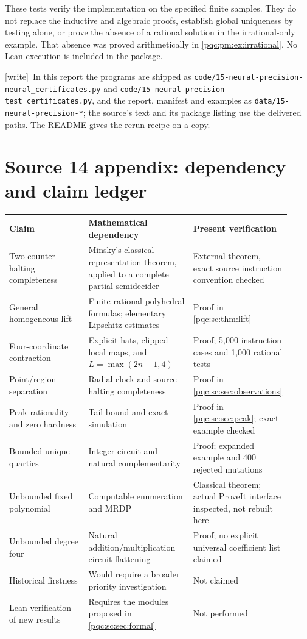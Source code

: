 \documentclass[11pt,letterpaper]{article}
\numberwithin{equation}{section}
\theoremstyle{definition}
\theoremstyle{remark}
\newcommand{\code}[1]{\nolinkurl{#1}}
\newcommand{\wtag}{\textup{[write]}}
\begin{document}
These tests verify the implementation on the specified finite samples.
They do not replace the inductive and algebraic proofs, establish global
uniqueness by testing alone, or prove the absence of a rational solution in
the irrational-only example. That absence was proved arithmetically in
\cref{pqc:pm:ex:irrational}. No Lean execution is included in the package.

\wtag\ In this report the programs are shipped as
\code{code/15-neural-precision-neural_certificates.py} and
\code{code/15-neural-precision-test_certificates.py}, and the report, manifest
and examples as \code{data/15-neural-precision-*}; the source's text and its
package listing use the delivered paths. The README gives the rerun recipe on a
copy.

\section{Source 14 appendix: dependency and claim ledger}
\begin{longtable}{>{\raggedright\arraybackslash}p{0.28\linewidth}>{\raggedright\arraybackslash}p{0.37\linewidth}>{\raggedright\arraybackslash}p{0.27\linewidth}}
\toprule
Claim & Mathematical dependency & Present verification \\
\midrule
\endhead
Two-counter halting completeness & Minsky's classical representation theorem,
applied to a complete partial semidecider & External theorem, exact source
instruction convention checked\\
General homogeneous lift & Finite rational polyhedral formulas; elementary
Lipschitz estimates & Proof in \cref{pqc:sc:thm:lift}\\
Four-coordinate contraction & Explicit hats, clipped local maps, and
$L=\max(2n+1,4)$ & Proof; 5,000 instruction cases and 1,000 rational tests\\
Point/region separation & Radial clock and source halting completeness &
Proof in \cref{pqc:sc:sec:observations}\\
Peak rationality and zero hardness & Tail bound and exact simulation &
Proof in \cref{pqc:sc:sec:peak}; exact example checked\\
Bounded unique quartics & Integer circuit and natural complementarity &
Proof; expanded example and 400 rejected mutations\\
Unbounded fixed polynomial & Computable enumeration and MRDP &
Classical theorem; actual ProveIt interface inspected, not rebuilt here\\
Unbounded degree four & Natural addition/multiplication circuit flattening &
Proof; no explicit universal coefficient list claimed\\
Historical firstness & Would require a broader priority investigation &
Not claimed\\
Lean verification of new results & Requires the modules proposed in
\cref{pqc:sc:sec:formal} & Not performed\\
\bottomrule
\end{longtable}
\end{document}
